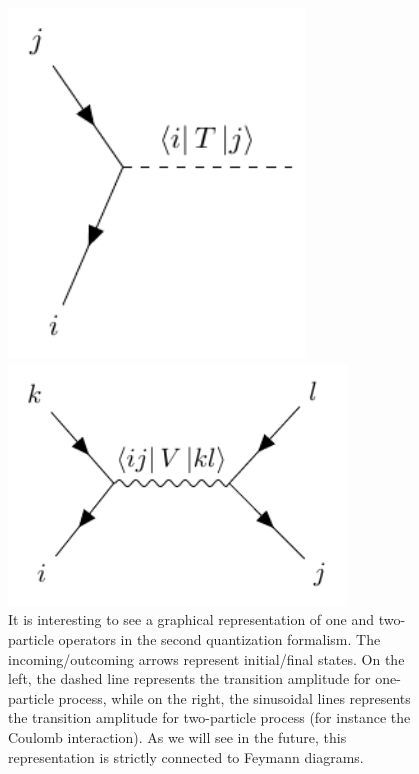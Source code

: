 \documentclass[../main/main.tex]{subfiles}
\begin{document}
\begin{figure}[h!]
\begin{minipage}[c]{0.5\linewidth}
\centering
\includegraphics[width=0.7\textwidth]{../lessons/3_image/1.pdf}
\end{minipage}
\begin{minipage}[]{0.5\linewidth}
\centering
\includegraphics[width=0.8\textwidth]{../lessons/3_image/2.pdf}
\end{minipage}
\caption{\label{fig:} It is interesting to see a graphical representation of one and two-particle operators in the second quantization formalism. The incoming/outcoming arrows represent initial/final states. On the left, the dashed line represents the transition amplitude for one-particle process, while on the right, the sinusoidal lines represents the transition amplitude for two-particle process (for instance the Coulomb interaction). As we will see in the future, this representation is strictly connected to Feymann diagrams.}
\end{figure}
\end{document}
